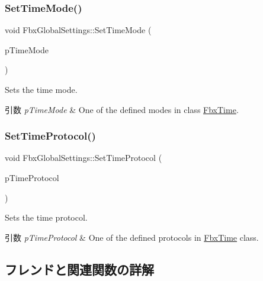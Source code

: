 \subsubsection{\texorpdfstring{Set\+Time\+Mode()}{SetTimeMode()}}
{\footnotesize\ttfamily void Fbx\+Global\+Settings\+::\+Set\+Time\+Mode (\begin{DoxyParamCaption}\item[{\hyperlink{class_fbx_time_acc529b00a0e8d4c3da3702449ca93031}{Fbx\+Time\+::\+E\+Mode}}]{p\+Time\+Mode }\end{DoxyParamCaption})}

Sets the time mode. 
\begin{DoxyParams}{引数}
{\em p\+Time\+Mode} & One of the defined modes in class \hyperlink{class_fbx_time}{Fbx\+Time}. \\
\hline
\end{DoxyParams}
\mbox{\label{class_fbx_global_settings_ac3116e61ac13970a735d641b40b44382}} 
\subsubsection{\texorpdfstring{Set\+Time\+Protocol()}{SetTimeProtocol()}}
{\footnotesize\ttfamily void Fbx\+Global\+Settings\+::\+Set\+Time\+Protocol (\begin{DoxyParamCaption}\item[{\hyperlink{class_fbx_time_a10ffa1fdce0aa7f63ec24bdd23afff4b}{Fbx\+Time\+::\+E\+Protocol}}]{p\+Time\+Protocol }\end{DoxyParamCaption})}

Sets the time protocol. 
\begin{DoxyParams}{引数}
{\em p\+Time\+Protocol} & One of the defined protocols in \hyperlink{class_fbx_time}{Fbx\+Time} class. \\
\hline
\end{DoxyParams}


\subsection{フレンドと関連関数の詳解}
\mbox{\label{class_fbx_global_settings_aac0b71d5f5893e5b1c45f6eba4e78b24}} 
